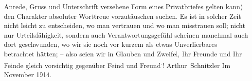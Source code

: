                Anrede, Gruss und Unterschrift versehene Form eines Privatbriefes gelten kann) den
               Charakter absoluter Worttreue vorzutäuschen suchen. Es ist in solcher Zeit nicht
               leicht zu entscheiden, wo man vertrauen und wo man misstrauen soll; nicht nur
               Urteilsfähigkeit, sondern auch Verantwortungsgefühl scheinen manchmal auch dort
               geschwunden, wo wir sie noch vor kurzem als etwas Unverlierbares betrachtet hätten; –
               also seien wir in Glauben und Zweifel, Ihr Freunde und Ihr Feinde gleich vorsichtig
               gegenüber Feind und Freund\substVorne{}\textsuperscript{.}\substDazwischen{}!\substHinten{}\pend
           \pstart \spacefill\mbox{Arthur Schnitzler}\pend{}
\pstart
           Im November 1914.\pend
           \endnumbering{}
\begin{anhang}
\end{anhang}
      